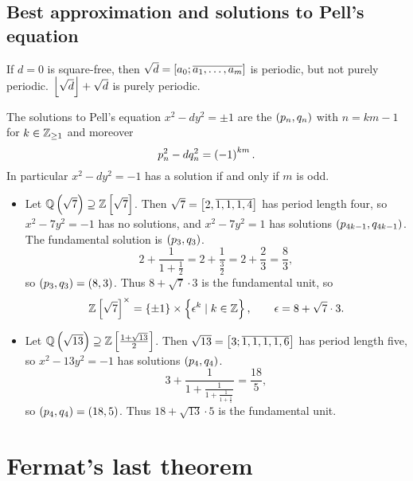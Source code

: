 \subsection{Best approximation and solutions to Pell's equation}

If $ d = 0 $ is square-free, then $ \sqrt{d} = \sbr{a_0; \overline{a_1, \dots, a_m}} $ is periodic, but not purely periodic. $ \left\lfloor \sqrt{d} \right\rfloor + \sqrt{d} $ is purely periodic.

\begin{theorem}
The solutions to Pell's equation $ x^2 - dy^2 = \pm 1 $ are the $ \br{p_n, q_n} $ with $ n = km - 1 $ for $ k \in \mathbb{Z}_{\ge 1} $ and moreover
$$ p_n^2 - dq_n^2 = \br{-1}^{km}. $$
In particular $ x^2 - dy^2 = -1 $ has a solution if and only if $ m $ is odd.
\end{theorem}

\begin{example*}
\hfill
\begin{itemize}
\item Let $ \Q\br{\sqrt{7}} \supseteq \Z\sbr{\sqrt{7}} $. Then $ \sqrt{7} = \sbr{2, \overline{1, 1, 1, 4}} $ has period length four, so $ x^2 - 7y^2 = -1 $ has no solutions, and $ x^2 - 7y^2 = 1 $ has solutions $ \br{p_{4k - 1}, q_{4k - 1}} $. The fundamental solution is $ \br{p_3, q_3} $.
$$ 2 + \dfrac{1}{1 + \tfrac{1}{2}} = 2 + \dfrac{1}{\tfrac{3}{2}} = 2 + \dfrac{2}{3} = \dfrac{8}{3}, $$
so $ \br{p_3, q_3} = \br{8, 3} $. Thus $ 8 + \sqrt{7} \cdot 3 $ is the fundamental unit, so
$$ \Z\sbr{\sqrt{7}}^\times = \cbr{\pm 1} \times \cbr{\epsilon^k \mid k \in \Z}, \qquad \epsilon = 8 + \sqrt{7} \cdot 3. $$
\item Let $ \Q\br{\sqrt{13}} \supseteq \Z\sbr{\tfrac{1 + \sqrt{13}}{2}} $. Then $ \sqrt{13} = \sbr{3; \overline{1, 1, 1, 1, 6}} $ has period length five, so $ x^2 - 13y^2 = -1 $ has solutions $ \br{p_4, q_4} $.
$$ 3 + \dfrac{1}{1 + \tfrac{1}{1 + \tfrac{1}{1 + \tfrac{1}{1}}}} = \dfrac{18}{5}, $$
so $ \br{p_4, q_4} = \br{18, 5} $. Thus $ 18 + \sqrt{13} \cdot 5 $ is the fundamental unit.
\end{itemize}
\end{example*}

\pagebreak

\appendix

\section{Fermat's last theorem}


